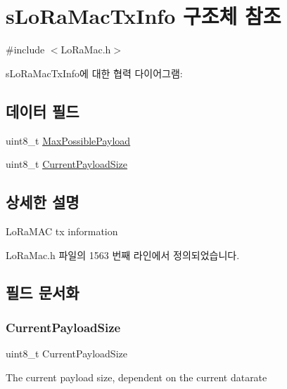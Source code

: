 \hypertarget{structs_lo_ra_mac_tx_info}{}\section{s\+Lo\+Ra\+Mac\+Tx\+Info 구조체 참조}
\label{structs_lo_ra_mac_tx_info}


{\ttfamily \#include $<$Lo\+Ra\+Mac.\+h$>$}



s\+Lo\+Ra\+Mac\+Tx\+Info에 대한 협력 다이어그램\+:
\subsection*{데이터 필드}
\begin{DoxyCompactItemize}
\item 
uint8\+\_\+t \mbox{\hyperlink{structs_lo_ra_mac_tx_info_aa2c8329cf5f4dd8fe4b1563a40a3f642}{Max\+Possible\+Payload}}
\item 
uint8\+\_\+t \mbox{\hyperlink{structs_lo_ra_mac_tx_info_afd5874846b1ddb673f84f5f70d1281e2}{Current\+Payload\+Size}}
\end{DoxyCompactItemize}


\subsection{상세한 설명}
Lo\+Ra\+M\+AC tx information 

Lo\+Ra\+Mac.\+h 파일의 1563 번째 라인에서 정의되었습니다.



\subsection{필드 문서화}
\mbox{\label{structs_lo_ra_mac_tx_info_afd5874846b1ddb673f84f5f70d1281e2}} 
\subsubsection{\texorpdfstring{Current\+Payload\+Size}{CurrentPayloadSize}}
{\footnotesize\ttfamily uint8\+\_\+t Current\+Payload\+Size}

The current payload size, dependent on the current datarate 

